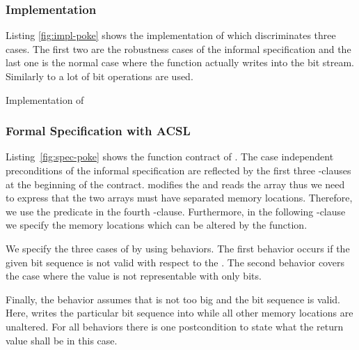 \subsubsection{Implementation}
\label{impl-poke}
Listing \ref{fig:impl-poke} shows the implementation of \poke
which discriminates three cases. The first two are the robustness cases
of the informal specification and the last one is
the normal case where the function actually writes into the bit stream.
Similarly to \peek a lot of bit operations are used. 

\begin{listing}[hbt]
\begin{minipage}{\textwidth}

\end{minipage}
\caption{\label{fig:impl-poke} Implementation of \poke}
\end{listing}



\clearpage
\subsubsection{Formal Specification with ACSL}
\label{formal-poke}

Listing~\ref{fig:spec-poke} shows the function contract of \poke.
The case independent preconditions of the informal specification 
are reflected by the  first three -clauses at the beginning of the contract.
\poke modifies the  and reads the array
 thus we need to express 
that the two arrays must have separated memory locations. 
Therefore, we use the predicate  in the fourth -clause.
Furthermore, in the following -clause we specify the memory locations which 
can be altered by the function.

We specify the three cases of \poke by using behaviors. 
The first behavior  occurs if the given bit sequence is not valid with respect to the . 
The second behavior  covers the case where the value  
is not representable with only  bits.

Finally, the behavior  assumes 
that  is not too big and the bit sequence is valid. 
Here, \poke writes the particular bit sequence into  
while all other memory locations are unaltered.
For all behaviors there is one postcondition to state what
the return value shall be in this case.


